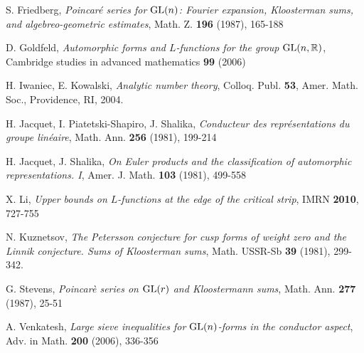 \documentclass[11pt]{amsart}
\theoremstyle{plain}
\numberwithin{equation}{section}
\theoremstyle{definition}
\begin{document}
\begin{thebibliography}{BHM}
 
 S. Friedberg, \emph{Poincar\'e series for ${\rm GL}(n)$: Fourier expansion, Kloosterman sums, and algebreo-geometric estimates}, Math. Z. \textbf{196}  (1987), 165-188


 
 D. Goldfeld, \emph{Automorphic forms and $L$-functions for the group ${\rm GL}(n, \Bbb{R})$}, Cambridge studies in advanced mathematics \textbf{99} (2006)

 
  H. Iwaniec, E. Kowalski, \emph{Analytic number theory},   Colloq. Publ. \textbf{53}, Amer. Math. Soc., Providence, RI, 2004.

 
 H. Jacquet, I. Piatetski-Shapiro, J. Shalika, \emph{Conducteur des repr\'esentations du groupe lin\'eaire}, Math. Ann. \textbf{256} (1981),  199-214

 H. Jacquet, J. Shalika, \emph{On Euler products and the classification of automorphic representations. I}, Amer. J. Math. \textbf{103} (1981), 499-558



 
 X. Li, \emph{Upper bounds on $L$-functions at the edge of the critical strip}, IMRN \textbf{2010}, 727-755

 
 N. Kuznetsov, \emph{The Petersson conjecture for cusp forms of weight zero and the Linnik conjecture. Sums of Klooster\-man sums}, Math. USSR-Sb \textbf{39} (1981), 299-342.

 
 G. Stevens, \emph{Poincar\`e series on ${\rm GL}( r)$ and Kloostermann sums}, Math. Ann. \textbf{277} (1987), 25-51

 A. Venkatesh, \emph{Large sieve inequalities for ${\rm GL}(n)$-forms in the conductor aspect}, Adv. in Math. \textbf{200} (2006), 336-356

  
\end{thebibliography}
\end{document}
